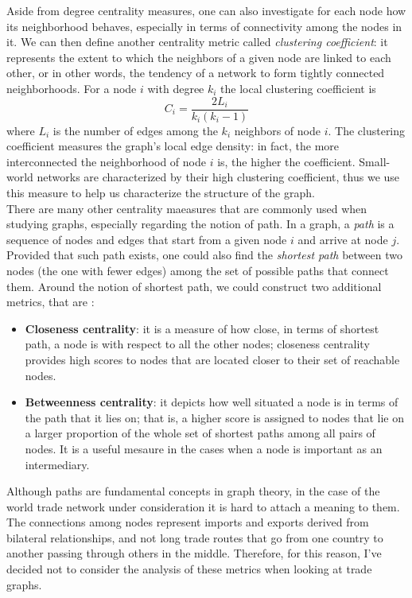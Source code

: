 Aside from degree centrality measures, one can also investigate for each node how its neighborhood behaves, especially in terms of connectivity among the nodes in it. We can then define another centrality metric called \textit{clustering coefficient}: it represents the extent to which the neighbors of a given node are linked to each other, or in other words, the tendency of a network to form tightly connected neighborhoods. For a node $i$ with degree $k_i$ the local clustering coefficient is
\[
    C_i = \frac{2 L_i}{k_i(k_i-1)}
\]
where $L_i$ is the number of edges among the $k_i$ neighbors of node $i$. The clustering coefficient measures the graph's local edge density: in fact, the more interconnected the neighborhood of node $i$ is, the higher the coefficient. Small-world networks are characterized by their high clustering coefficient, thus we use this measure to help us characterize the structure of the graph.\\

There are many other centrality maeasures that are commonly used when studying graphs, especially regarding the notion of path. In a graph, a \textit{path} is a sequence of nodes and edges that start from a given node $i$ and arrive at node $j$. Provided that such path exists, one could also find the \textit{shortest path} between two nodes (the one with fewer edges) among the set of possible paths that connect them. Around the notion of shortest path, we could construct two additional metrics, that are \cite{benedictis2014bacicepii}:
\begin{itemize}
    \item \textbf{Closeness centrality}: it is a measure of how close, in terms of shortest path, a node is with respect to all the other nodes; closeness centrality provides high scores to nodes that are located closer to their set of reachable nodes.
    \item \textbf{Betweenness centrality}: it depicts how well situated a node is in terms of the path that it lies on; that is, a higher score is assigned to nodes that lie on a larger proportion of the whole set of shortest paths among all pairs of nodes. It is a useful mesaure in the cases when a node is important as an intermediary.
\end{itemize}
Although paths are fundamental concepts in graph theory, in the case of the world trade network under consideration it is hard to attach a meaning to them. The connections among nodes represent imports and exports derived from bilateral relationships, and not long trade routes that go from one country to another passing through others in the middle. Therefore, for this reason, I've decided not to consider the analysis of these metrics when looking at trade graphs.


